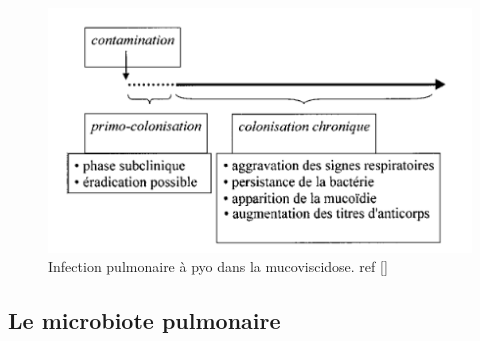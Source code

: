 \documentclass[12pt,a4paper]{article}
\begin{document}
\begin{figure}[ht]
\begin{center}
\includegraphics[scale=0.8]{img/chronic.png}\hfill
\end{center}
\caption{Infection pulmonaire à pyo dans la mucoviscidose. ref []}
\label{bach}
\end{figure}


\subsection{Le microbiote pulmonaire}
\end{document}
